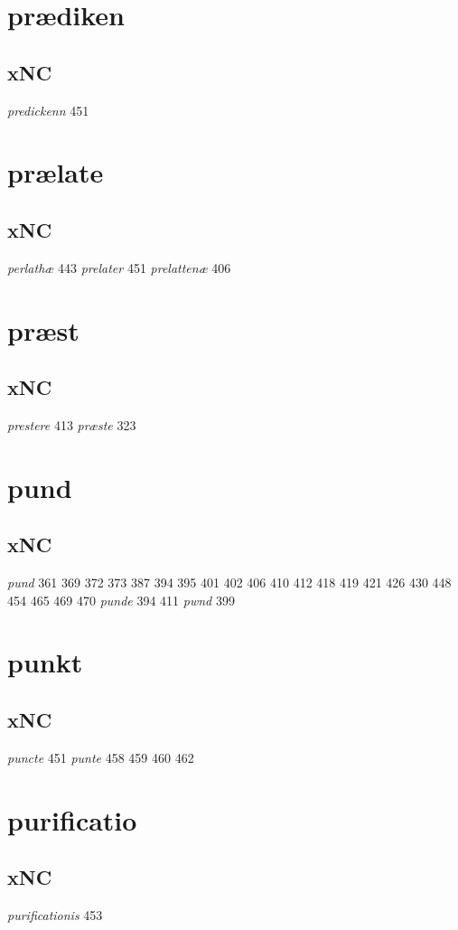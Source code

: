 \documentclass[a4paper,twocolumn]{article}
\begin{document}
\section{prædiken}
\label{sec:org9b1d64c}
\subsection{xNC}
\label{sec:org376150d}
\emph{predickenn} 451 
\section{prælate}
\label{sec:orgc99e46b}
\subsection{xNC}
\label{sec:org1146699}
\emph{perlathæ} 443 \emph{prelater} 451 \emph{prelattenæ} 406 
\section{præst}
\label{sec:org57ee704}
\subsection{xNC}
\label{sec:orgfb66bc9}
\emph{prestere} 413 \emph{præste} 323 
\section{pund}
\label{sec:org2449114}
\subsection{xNC}
\label{sec:org626ca75}
\emph{pund} 361 369 372 373 387 394 395 401 402 406 410 412 418 419 421 426 430 448 454 465 469 470 \emph{punde} 394 411 \emph{pwnd} 399 
\section{punkt}
\label{sec:orgc780eca}
\subsection{xNC}
\label{sec:org8a90427}
\emph{puncte} 451 \emph{punte} 458 459 460 462 
\section{purificatio}
\label{sec:org2afdd04}
\subsection{xNC}
\label{sec:org252c009}
\emph{purificationis} 453 
\end{document}
